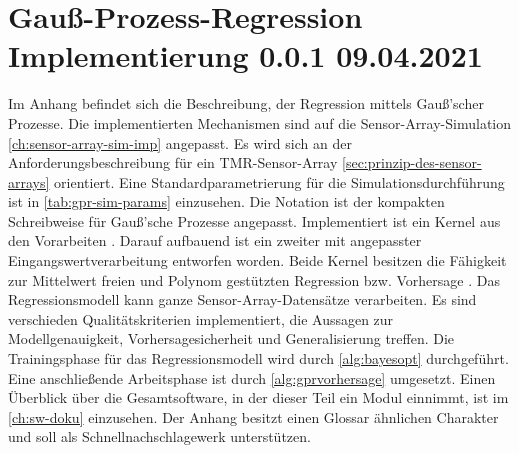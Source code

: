 %

\chapter{Gauß-Prozess-Regression Implementierung 0.0.1 09.04.2021}\label{ch:gpr-imp}


Im Anhang befindet sich die Beschreibung, der Regression mittels Gauß'scher Prozesse. Die implementierten Mechanismen sind auf die Sensor-Array-Simulation \autoref{ch:sensor-array-sim-imp} angepasst. Es wird sich  an der Anforderungsbeschreibung für ein TMR-Sensor-Array \autoref{sec:prinzip-des-sensor-arrays} orientiert. Eine Standardparametrierung für die Simulationsdurchführung ist in \autoref{tab:gpr-sim-params} einzusehen. Die Notation ist der kompakten Schreibweise für Gauß'sche Prozesse \cite{Rasmussen2006} angepasst. Implementiert ist ein Kernel aus den Vorarbeiten \cite{Schuethe2020b}\cite{Schuethe2020}. Darauf aufbauend ist ein zweiter mit angepasster Eingangswertverarbeitung entworfen worden. Beide Kernel besitzen die Fähigkeit zur Mittelwert freien und Polynom gestützten Regression bzw. Vorhersage \cite{Rasmussen2006}. Das Regressionsmodell kann ganze Sensor-Array-Datensätze verarbeiten. Es sind verschieden Qualitätskriterien implementiert, die Aussagen zur Modellgenauigkeit, Vorhersagesicherheit und Generalisierung treffen. Die Trainingsphase für das Regressionsmodell wird durch \autoref{alg:bayesopt} durchgeführt. Eine anschließende Arbeitsphase ist durch \autoref{alg:gprvorhersage} umgesetzt. Einen Überblick über die Gesamtsoftware, in der dieser Teil ein Modul einnimmt, ist im \autoref{ch:sw-doku} einzusehen. Der Anhang besitzt einen Glossar ähnlichen Charakter und soll als Schnellnachschlagewerk unterstützen.


